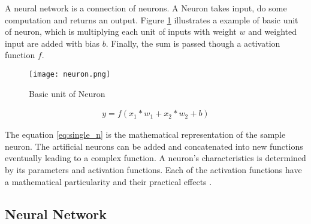 A neural network is a connection of neurons. A Neuron takes input, do some computation and returns an output.  Figure \ref{fig:basic neuron} illustrates a example of   basic unit of neuron, which is multiplying each unit of inputs with weight $w$ and weighted input are added with bias $b$. Finally, the sum is passed though a activation function $ f $.   
\begin{figure}[H]
    \centering    
    \texttt{[image: neuron.png]}
    \caption{Basic unit of Neuron \parencite{VictorZhou}}
    \label{fig:basic neuron}
\end{figure}


\begin{align}
    y = f(x_1 * w_1 + x_2 * w_2 + b) \label{eq:single_n}
\end{align}

The equation \ref{eq:single_n} is the mathematical representation of the sample neuron. The artificial neurons can be added and concatenated into new functions eventually leading to a complex function. A neuron's characteristics is determined by its parameters and activation functions. Each of the activation functions have a mathematical particularity and their practical effects \parencite{Lederer.25012021}. 

\subsection*{Neural Network}





